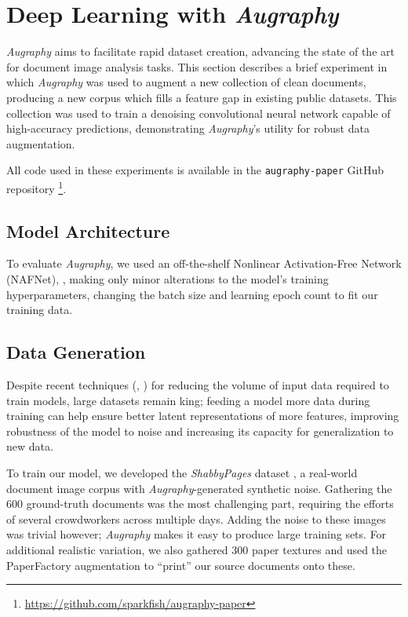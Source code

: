 \documentclass[runningheads]{llncs}
\begin{document}
\section{Deep Learning with \emph{Augraphy}}
\emph{Augraphy} aims to facilitate rapid dataset creation, advancing the state of the art for document image analysis tasks.
This section describes a brief experiment in which \emph{Augraphy} was used to augment a new collection of clean documents, producing a new corpus which fills a feature gap in existing public datasets. This collection was used to train a denoising convolutional neural network capable of high-accuracy predictions, demonstrating \emph{Augraphy}'s utility for robust data augmentation.

All code used in these experiments is available in the \texttt{augraphy-paper} GitHub repository \footnote{\url{https://github.com/sparkfish/augraphy-paper}}.

\subsection{Model Architecture}
To evaluate \emph{Augraphy}, we used an off-the-shelf Nonlinear Activation-Free Network (NAFNet), \cite{ref_nafnet}, making only minor alterations to the model's training hyperparameters, changing the batch size and learning epoch count to fit our training data.

\subsection{Data Generation}
Despite recent techniques (\cite{ref_tvt2040}, \cite{ref_vtssds}) for reducing the volume of input data required to train models, large datasets remain king; feeding a model more data during training can help ensure better latent representations of more features, improving robustness of the model to noise and increasing its capacity for generalization to new data.

To train our model, we developed the \emph{ShabbyPages} dataset \cite{ref_ShabbyPages}, a real-world document image corpus with \emph{Augraphy}-generated synthetic noise.
Gathering the 600 ground-truth documents was the most challenging part, requiring the efforts of several crowdworkers across multiple days. Adding the noise to these images was trivial however; \emph{Augraphy} makes it easy to produce large training sets.
For additional realistic variation, we also gathered 300 paper textures and used the PaperFactory augmentation to ``print'' our source documents onto these.
\end{document}
